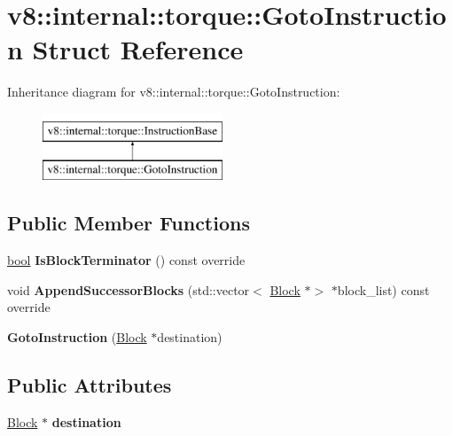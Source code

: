 \hypertarget{structv8_1_1internal_1_1torque_1_1GotoInstruction}{}\section{v8\+:\+:internal\+:\+:torque\+:\+:Goto\+Instruction Struct Reference}
\label{structv8_1_1internal_1_1torque_1_1GotoInstruction}
Inheritance diagram for v8\+:\+:internal\+:\+:torque\+:\+:Goto\+Instruction\+:\begin{figure}[H]
\begin{center}
\leavevmode
\includegraphics[height=2.000000cm]{structv8_1_1internal_1_1torque_1_1GotoInstruction}
\end{center}
\end{figure}
\subsection*{Public Member Functions}
\begin{DoxyCompactItemize}
\item 
\mbox{\label{structv8_1_1internal_1_1torque_1_1GotoInstruction_afac9e243c7609124aeb7d359e7bf6cb3}} 
\mbox{\hyperlink{classbool}{bool}} {\bfseries Is\+Block\+Terminator} () const override
\item 
\mbox{\label{structv8_1_1internal_1_1torque_1_1GotoInstruction_acddb1291021267f8532c11100ffe65c4}} 
void {\bfseries Append\+Successor\+Blocks} (std\+::vector$<$ \mbox{\hyperlink{classv8_1_1internal_1_1torque_1_1Block}{Block}} $\ast$$>$ $\ast$block\+\_\+list) const override
\item 
\mbox{\label{structv8_1_1internal_1_1torque_1_1GotoInstruction_add29be17036a3686331dd15328ac15d3}} 
{\bfseries Goto\+Instruction} (\mbox{\hyperlink{classv8_1_1internal_1_1torque_1_1Block}{Block}} $\ast$destination)
\end{DoxyCompactItemize}
\subsection*{Public Attributes}
\begin{DoxyCompactItemize}
\item 
\mbox{\label{structv8_1_1internal_1_1torque_1_1GotoInstruction_a0cf8a3d5408c5c2164cabcd047b5aa38}} 
\mbox{\hyperlink{classv8_1_1internal_1_1torque_1_1Block}{Block}} $\ast$ {\bfseries destination}
\end{DoxyCompactItemize}


